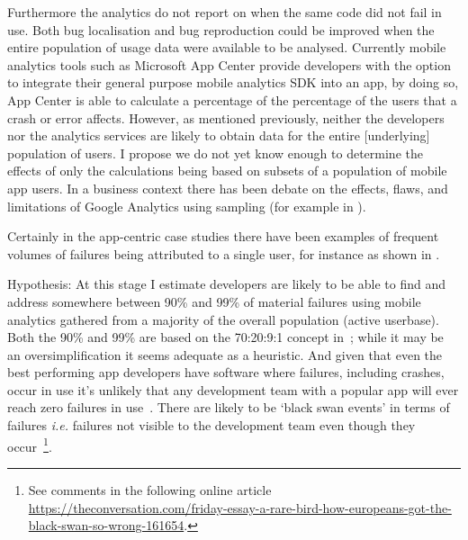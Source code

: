 Furthermore the analytics do not report on when the same code did not fail in use. Both bug localisation and bug reproduction could be improved when the entire population of usage data were available to be analysed. Currently mobile analytics tools such as Microsoft App Center provide developers with the option to integrate their general purpose mobile analytics SDK into an app, by doing so, App Center is able to calculate a percentage of the percentage of the users that a crash or error affects. 
%
However, as mentioned previously, neither the developers nor the analytics services are likely to obtain data for the entire [underlying] population of users. I propose we do not yet know enough to determine the effects of only the calculations being based on subsets of a population of mobile app users. In a business context there has been debate on the effects, flaws, and limitations of Google Analytics using sampling (for example in ).

Certainly in the app-centric case studies there have been examples of frequent volumes of failures being attributed to a single user, for instance as shown in . 

Hypothesis: At this stage I estimate developers are likely to be able to find and address somewhere between 90\% and 99\% of material failures using mobile analytics gathered from a majority of the overall population (active userbase). Both the 90\% and 99\% are based on the 70:20:9:1 concept in~; while it may be an oversimplification it seems adequate as a heuristic. And given that even the best performing app developers have software where failures, including crashes, occur in use it's unlikely that any development team with a popular app will ever reach zero failures in use~. There are likely to be `black swan events' in terms of failures \emph{i.e.} failures not visible to the development team even though they occur~\footnote{See comments in the following online article \url{https://theconversation.com/friday-essay-a-rare-bird-how-europeans-got-the-black-swan-so-wrong-161654}.}.


